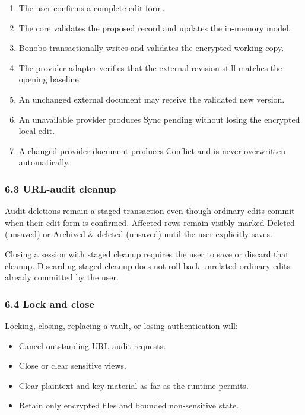 \documentclass[
  letterpaper,
]{article}
\providecommand{\tightlist}{%
  \setlength{\itemsep}{0pt}\setlength{\parskip}{0pt}}
\begin{document}
\begin{enumerate}
\def\labelenumi{\arabic{enumi}.}
\tightlist
\item
  The user confirms a complete edit form.
\item
  The core validates the proposed record and updates the in-memory model.
\item
  Bonobo transactionally writes and validates the encrypted working copy.
\item
  The provider adapter verifies that the external revision still matches the opening baseline.
\item
  An unchanged external document may receive the validated new version.
\item
  An unavailable provider produces Sync pending without losing the encrypted local edit.
\item
  A changed provider document produces Conflict and is never overwritten automatically.
\end{enumerate}

\subsubsection{6.3 URL-audit cleanup}\label{63-url-audit-cleanup}

Audit deletions remain a staged transaction even though ordinary edits commit when their edit form is confirmed.
Affected rows remain visibly marked Deleted (unsaved) or Archived \& deleted (unsaved) until the user explicitly saves.

Closing a session with staged cleanup requires the user to save or discard that cleanup. Discarding staged cleanup does
not roll back unrelated ordinary edits already committed by the user.

\subsubsection{6.4 Lock and close}\label{64-lock-and-close}

Locking, closing, replacing a vault, or losing authentication will:

\begin{itemize}
\tightlist
\item
  Cancel outstanding URL-audit requests.
\item
  Close or clear sensitive views.
\item
  Clear plaintext and key material as far as the runtime permits.
\item
  Retain only encrypted files and bounded non-sensitive state.
\end{itemize}
\end{document}
